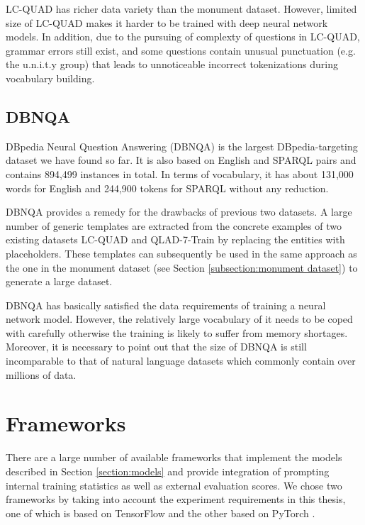 LC-QUAD has richer data variety than the monument dataset. However, limited size of LC-QUAD makes it harder to be trained with deep neural network models. In addition, due to the pursuing of complexty of questions in LC-QUAD, grammar errors still exist, and some questions contain unusual punctuation (e.g. the u.n.i.t.y group) that leads to unnoticeable incorrect tokenizations during vocabulary building.

\subsection{DBNQA} \label{subsection:dbnqa}

DBpedia Neural Question Answering (DBNQA) \cite{Soru2018dbnqa} is the largest DBpedia-targeting dataset we have found so far. It is also based on English and SPARQL pairs and contains 894,499 instances in total. In terms of vocabulary, it has about 131,000 words for English and 244,900 tokens for SPARQL without any reduction.

DBNQA provides a remedy for the drawbacks of previous two datasets. A large number of generic templates are extracted from the concrete examples of two existing datasets LC-QUAD and QLAD-7-Train \cite{usbeck20177th} by replacing the entities with placeholders. These templates can subsequently be used in the same approach as the one in the monument dataset (see Section \ref{subsection:monument dataset}) to generate a large dataset.

DBNQA has basically satisfied the data requirements of training a neural network model. However, the relatively large vocabulary of it needs to be coped with carefully otherwise the training is likely to suffer from memory shortages. Moreover, it is necessary to point out that the size of DBNQA is still incomparable to that of natural language datasets which commonly contain over millions of data.

\section{Frameworks} \label{section:frameworks}

There are a large number of available frameworks that implement the models described in Section \ref{section:models} and provide integration of prompting internal training statistics as well as external evaluation scores. We chose two frameworks by taking into account the experiment requirements in this thesis, one of which is based on TensorFlow \cite{tensorflow2015-whitepaper} and the other based on PyTorch \cite{paszke2017automatic}.

